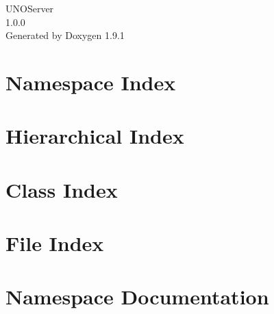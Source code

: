 \let\mypdfximage\pdfximage\def\pdfximage{\immediate\mypdfximage}\documentclass[twoside]{book}
\newcommand{\+}{\discretionary{\mbox{\scriptsize$\hookleftarrow$}}{}{}}
\newcommand{\clearemptydoublepage}{%
  \newpage{\pagestyle{empty}\cleardoublepage}%
}
\begin{document}
\raggedbottom

\begin{titlepage}
\vspace*{7cm}
\begin{center}%
{\Large UNOServer \\[1ex]\large 1.\+0.\+0 }\\
\vspace*{1cm}
{\large Generated by Doxygen 1.9.1}\\
\end{center}
\end{titlepage}
\clearemptydoublepage
{}
\tableofcontents
\clearemptydoublepage
{}

\chapter{Namespace Index}

\chapter{Hierarchical Index}

\chapter{Class Index}

\chapter{File Index}

\chapter{Namespace Documentation}










\end{document}
